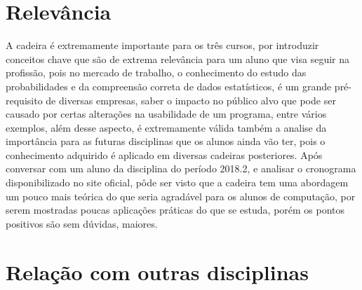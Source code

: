 \documentclass[10pt]{extarticle}
\begin{document}
 \section{Relevância}
 \hspace{\parindent}A cadeira é extremamente importante para os três cursos, por introduzir conceitos chave que são de extrema relevância para um aluno que visa seguir na profissão, pois no mercado de trabalho, o conhecimento do estudo das probabilidades e da compreensão correta de dados estatísticos, é um grande pré-requisito de diversas empresas, saber o impacto no público alvo que pode ser causado por certas alterações na usabilidade de um programa, entre vários exemplos, além desse aspecto, é extremamente válida também a analise da importância para as futuras disciplinas que os alunos ainda vão ter, pois o conhecimento adquirido é aplicado em diversas cadeiras posteriores.  Após conversar com um aluno da disciplina do período 2018.2, e analisar o cronograma disponibilizado no site oficial, pôde ser visto que a cadeira tem uma abordagem um pouco mais teórica do que seria agradável para os alunos de computação, por serem mostradas poucas aplicações práticas do que se estuda, porém os pontos positivos são sem dúvidas, maiores. 
 \cite {1}
 \cite {2}
 \cite {3}
 \cite {4}
 \newpage
 
 \section{Relação com outras disciplinas}
 
\end{document}
